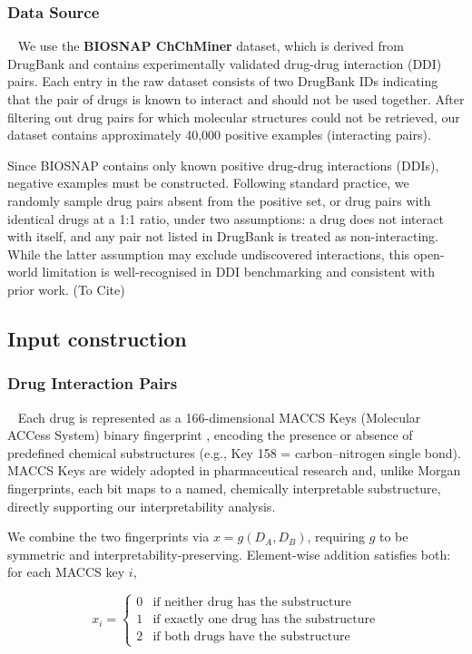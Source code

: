 \documentclass[letterpaper]{article} %
\begin{document}
\subsubsection{Data Source}
\ 
\newline
We use the \textbf{BIOSNAP ChChMiner} dataset, which is derived from DrugBank and contains experimentally validated drug-drug interaction (DDI) pairs. Each entry in the raw dataset consists of two DrugBank IDs indicating that the pair of drugs is known to interact and should not be used together. After filtering out drug pairs for which molecular structures could not be retrieved, our dataset contains approximately 40,000 positive examples (interacting pairs). 

Since BIOSNAP contains only known positive drug-drug interactions (DDIs), negative examples must be constructed. Following standard practice, we randomly sample drug pairs absent from the positive set, or drug pairs with identical drugs at a 1:1 ratio, under two assumptions: a drug does not interact with itself, and any pair not listed in DrugBank is treated as non-interacting. While the latter assumption may exclude undiscovered interactions, this open-world limitation is well-recognised in DDI benchmarking and consistent with prior work. (To Cite)

\subsection{Input construction}

\subsubsection{Drug Interaction Pairs}
\
\newline
Each drug is represented as a 166-dimensional MACCS Keys (Molecular ACCess System) binary fingerprint \cite{rdkit}, encoding the presence or absence of predefined chemical substructures (e.g., Key 158 = carbon–nitrogen single bond). MACCS Keys are widely adopted in pharmaceutical research \cite{durant2002reoptimization} and, unlike Morgan fingerprints, each bit maps to a named, chemically interpretable substructure, directly supporting our interpretability analysis. 

We combine the two fingerprints via $x = g(D_A, D_B)$, requiring $g$ to be symmetric and interpretability-preserving. Element-wise addition satisfies both: for each MACCS key $i$,

\begin{equation}
    x_i = \begin{cases}
        0 & \text{if neither drug has the substructure} \\
        1 & \text{if exactly one drug has the substructure} \\
        2 & \text{if both drugs have the substructure} 
        \end{cases}
\end{equation}
\end{document}
